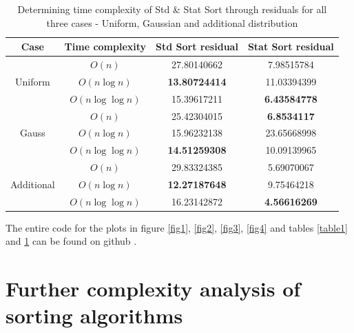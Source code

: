 \documentclass[12pt]{article}
\begin{document}
		\begin{table}
		\caption{Determining time complexity of Std \& Stat Sort through residuals for all three cases - Uniform, Gaussian and additional distribution}
		\begin{center}
		\begin{tabular}{ |c|c|c|c| }
		\hline
		
		Case & Time complexity & Std Sort residual & Stat Sort residual \\

		\hline\hline
		
		\multirow{3}{*}{Uniform} & $O(n)$ &		27.80140662 &  7.98515784  \\
	     & $O(n \log n)$ & \textbf{13.80724414}		& 11.03394399 \\
          & $O(n \log \log n)$ & 15.39617211 & \textbf{6.43584778} \\

        \hline\hline

		\multirow{3}{*}{Gauss} & $O(n)$ &		25.42304015 & \textbf{6.8534117}   \\
		 & $O(n \log n)$ & 15.96232138		& 23.65668998  \\        
         & $O(n \log \log n)$ & \textbf{14.51259308} & 10.09139965 \\

        \hline\hline

		\multirow{3}{*}{Additional} & $O(n)$ & 29.83324385	 & 5.69070067    \\
		 & $O(n \log n)$ & \textbf{12.27187648} & 9.75464218  \\
         & $O(n \log \log n)$ & 16.23142872 & \textbf{4.56616269} \\        

		\hline
		\end{tabular}
		\end{center}
		\label{table2}
		\end{table}

		
		The entire code for the plots in figure \ref{fig1}, \ref{fig2}, \ref{fig3}, \ref{fig4} and tables \ref{table1} and \ref{table2} can be found on github \cite{peta78}.

    \section{Further complexity analysis of sorting algorithms}
\end{document}

